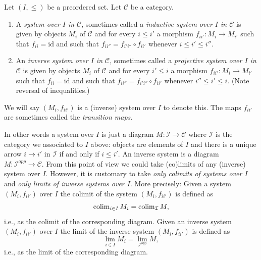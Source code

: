 \begin{definition}
\label{definition-system-over-poset}
Let $(I, \leq)$ be a preordered set. Let $\mathcal{C}$ be a category.
\begin{enumerate}
\item A {\it system over $I$ in $\mathcal{C}$}, sometimes called a
{\it inductive system over $I$ in $\mathcal{C}$} is given by
objects $M_i$ of $\mathcal{C}$ and for every $i \leq i'$ a
morphism $f_{ii'} : M_i \to M_{i'}$ such that $f_{ii}
= \text{id}$ and such that $f_{ii''} = f_{i'i''} \circ f_{i i'}$
whenever $i \leq i' \leq i''$.
\item An {\it inverse system over $I$ in $\mathcal{C}$},
sometimes called a {\it projective system over $I$ in $\mathcal{C}$}
is given by objects $M_i$ of $\mathcal{C}$ and for every $i' \leq i$ a
morphism $f_{ii'} : M_i \to M_{i'}$ such that $f_{ii}
= \text{id}$ and such that $f_{ii''} = f_{i'i''} \circ f_{i i'}$
whenever $i'' \leq i' \leq i$. (Note reversal of inequalities.)
\end{enumerate}
We will say $(M_i, f_{ii'})$ is a (inverse) system over $I$ to
denote this. The maps $f_{ii'}$ are sometimes
called the {\it transition maps}.
\end{definition}

\noindent
In other words a system over $I$ is just a diagram
$M : \mathcal{I} \to \mathcal{C}$ where $\mathcal{I}$ is the category
we associated to $I$ above: objects are elements of $I$ and
there is a unique arrow $i \to i'$ in $\mathcal{I}$ if and only if $i \leq i'$.
An inverse system is a diagram $M : \mathcal{I}^{opp} \to \mathcal{C}$.
From this point of view we could take (co)limits of any (inverse)
system over $I$. However, it is customary to take
{\it only colimits of systems over $I$} and
{\it only limits of inverse systems over $I$}.
More precisely: Given a system $(M_i, f_{ii'})$
over $I$ the colimit of the system
$(M_i, f_{ii'})$ is defined as
$$
\mathop{\mathrm{colim}}\nolimits_{i \in I} M_i = \mathop{\mathrm{colim}}\nolimits_\mathcal{I} M,
$$
i.e., as the colimit of the corresponding diagram.
Given an inverse system $(M_i, f_{ii'})$ over $I$ the limit
of the inverse system $(M_i, f_{ii'})$ is defined as
$$
\lim_{i \in I} M_i = \lim_{\mathcal{I}^{opp}} M,
$$
i.e., as the limit of the corresponding diagram.

